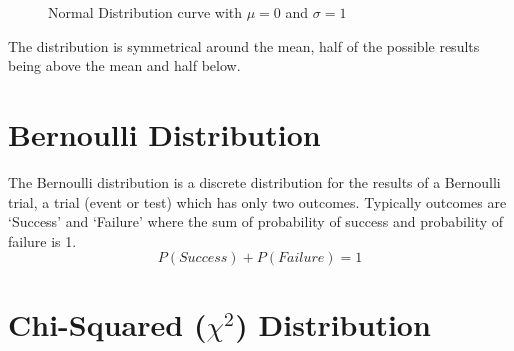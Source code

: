 \begin{figure}[hbt]
\caption{Normal Distribution curve with $\mu = 0$ and $\sigma = 1$}
\end{figure}

The distribution is symmetrical around the mean, half of the possible results being above the mean and half below.

\section{Bernoulli Distribution}
The Bernoulli distribution is a discrete distribution for the results of a Bernoulli trial, a trial (event or test) which has only two outcomes.  Typically outcomes are `Success' and `Failure' where the sum of probability of success and probability of failure is 1.
\begin{equation}
P(Success) + P(Failure) = 1
\end{equation}

\section{Chi-Squared ($\chi^2$) Distribution}

